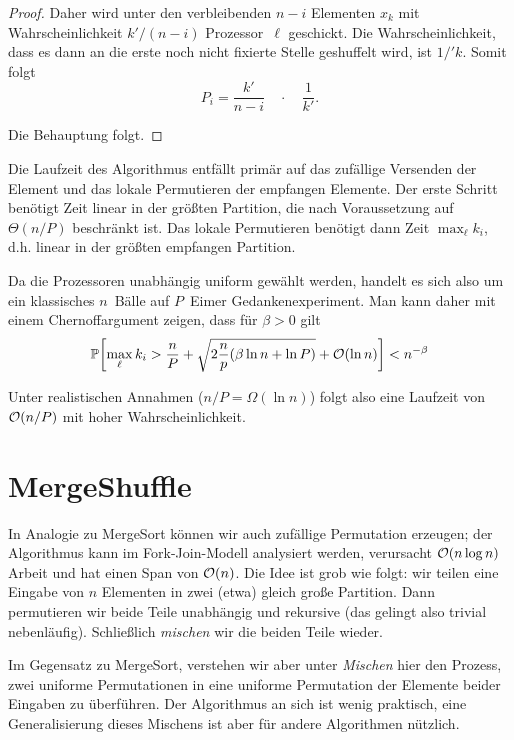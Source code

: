 \begin{proof}
        Daher wird unter den verbleibenden $n-i$ Elementen $x_k$ mit Wahrscheinlichkeit $k' / (n-i)$ Prozessor~$\ell$ geschickt.
        Die Wahrscheinlichkeit, dass es dann an die erste noch nicht fixierte Stelle geshuffelt wird, ist $1 / 'k$.
        Somit folgt
        \begin{equation}
            P_i = \frac{k'}{n - i} \quad \cdot \quad \frac{1}{k'}.
        \end{equation}

        \noindent
        Die Behauptung folgt.
    \end{proof}
\fi

Die Laufzeit des Algorithmus entfällt primär auf das zufällige Versenden der Element und das lokale Permutieren der empfangen Elemente.
Der erste Schritt benötigt Zeit linear in der größten Partition, die nach Voraussetzung auf $\Theta(n / P)$ beschränkt ist.
Das lokale Permutieren benötigt dann Zeit $\max_\ell k_i$, d.h. linear in der größten empfangen Partition.

Da die Prozessoren unabhängig uniform gewählt werden, handelt es sich also um ein klassisches $n$~Bälle auf $P$~Eimer Gedankenexperiment.
Man kann daher mit einem Chernoffargument zeigen, dass für $\beta > 0$ gilt
\begin{equation}
    \mathbb{P}\!\left[\max_\ell k_i > \frac{n}{P} + \sqrt{2 \frac n p (\beta \ln n + \ln P)  } + \mathcal{O}\!\left(\ln n\right)\right] <  n^{-\beta}
\end{equation}

Unter realistischen Annahmen ($n / P = \Omega(\ln n)$) folgt also eine Laufzeit von $\mathcal{O}\!\left(n / P\right)$ mit hoher Wahrscheinlichkeit.

\iffalse
    \section{MergeShuffle}
    In Analogie zu MergeSort können wir auch zufällige Permutation erzeugen;
    der Algorithmus kann im Fork-Join-Modell analysiert werden, verursacht $\mathcal{O}\!\left(n \log n\right)$ Arbeit und hat einen Span von $\mathcal{O}\!\left(n\right)$.
    Die Idee ist grob wie folgt:
    wir teilen eine Eingabe von $n$ Elementen in zwei (etwa) gleich große Partition.
    Dann permutieren wir beide Teile unabhängig und rekursive (das gelingt also trivial nebenläufig).
    Schließlich \emph{mischen} wir die beiden Teile wieder.

    Im Gegensatz zu MergeSort, verstehen wir aber unter \emph{Mischen} hier den Prozess,
    zwei uniforme Permutationen in eine uniforme Permutation der Elemente beider Eingaben zu überführen.
    Der Algorithmus an sich ist wenig praktisch, eine Generalisierung dieses Mischens ist aber für andere Algorithmen nützlich.


